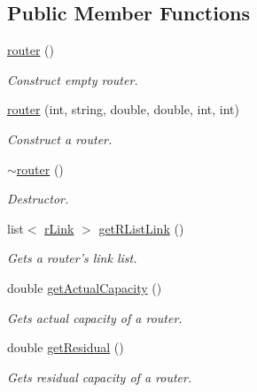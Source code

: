 \subsection*{Public Member Functions}
\begin{DoxyCompactItemize}
\item 
\hyperlink{classrouter_af5559739f6e4f9b1c7f7bf80e32f6cd9}{router} ()
\begin{DoxyCompactList}\small\item\em Construct empty router. \item\end{DoxyCompactList}\item 
\hyperlink{classrouter_a43d7888550284a3bffff71abf6c087eb}{router} (int, string, double, double, int, int)
\begin{DoxyCompactList}\small\item\em Construct a router. \item\end{DoxyCompactList}\item 
\hyperlink{classrouter_a64870f29b48d6ee6276ec27b1b18e189}{$\sim$router} ()
\begin{DoxyCompactList}\small\item\em Destructor. \item\end{DoxyCompactList}\item 
list$<$ \hyperlink{classrLink}{rLink} $>$ \hyperlink{classrouter_a36115bd5923217c64922b2231f05c304}{getRListLink} ()
\begin{DoxyCompactList}\small\item\em Gets a router's link list. \item\end{DoxyCompactList}\item 
double \hyperlink{classrouter_a0c1d4a7689e992d90b0fcbf4a958c8b4}{getActualCapacity} ()
\begin{DoxyCompactList}\small\item\em Gets actual capacity of a router. \item\end{DoxyCompactList}\item 
double \hyperlink{classrouter_a7d5187977fd2dbf2fa562d3953647699}{getResidual} ()
\begin{DoxyCompactList}\small\item\em Gets residual capacity of a router. \item\end{DoxyCompactList}\item 

\end{DoxyCompactItemize}
